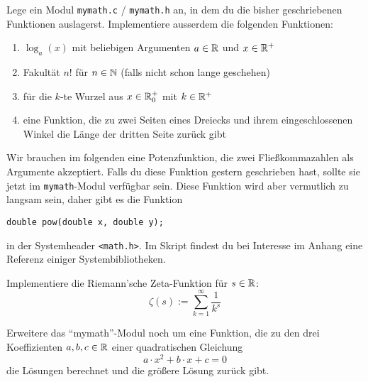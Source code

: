 \documentclass{uebungszettel}
\begin{document}
\begin{aufg} Lege ein Modul \verb|mymath.c| / \verb|mymath.h| an, in dem du die bisher geschriebenen Funktionen 
auslagerst. Implementiere ausserdem die folgenden Funktionen:
\begin{enumerate}
  \item $\log_a(x)$ mit beliebigen Argumenten $a \in \mathbb{R}$ und $x \in \mathbb{R}^+$
  \item Fakultät $n!$ für $n \in \mathbb{N}$ (falls nicht schon lange geschehen)
  \item für die $k$-te Wurzel aus $x\in \mathbb{R}^+_0$ mit $k \in \mathbb{R}^+$
  \item eine Funktion, die zu zwei Seiten eines Dreiecks und ihrem eingeschlossenen Winkel die Länge der dritten Seite zurück gibt
\end{enumerate}
\end{aufg}

\noindent Wir brauchen im folgenden eine Potenzfunktion, die zwei Fließkommazahlen als Argumente akzeptiert. Falls du diese 
Funktion gestern geschrieben hast, sollte sie jetzt im \verb|mymath|-Modul verfügbar sein. Diese Funktion wird aber 
vermutlich zu langsam sein, daher gibt es die Funktion 

\begin{verbatim}
double pow(double x, double y);
\end{verbatim}

in der Systemheader \verb|<math.h>|. Im Skript findest du bei Interesse im Anhang eine Referenz einiger Systembibliotheken.

\begin{aufg}
Implementiere die Riemann'sche Zeta-Funktion für $s \in \mathbb{R}$: $$
\zeta(s) := \sum_{k=1}^\infty \frac{1}{k^s} $$
\end{aufg}

\begin{aufg}
Erweitere das "`mymath"'-Modul noch um eine Funktion, die zu den drei Koeffizienten $a, b, c \in \mathbb{R}$ einer quadratischen Gleichung $$
a \cdot x^2 + b \cdot x + c = 0 $$
die Lösungen berechnet und die größere Lösung zurück gibt.
\end{aufg}
\end{document}
